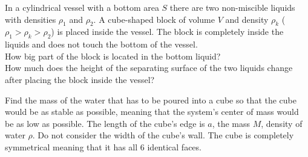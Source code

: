 \documentclass[11pt]{article}
\begin{document}

\probeng
In a cylindrical vessel with a bottom area $S$ there are two non-miscible liquids with densities $\rho_1$ and $\rho_2$. A cube-shaped block of volume $V$ and density $\rho_k$ ($\rho_1>\rho_k>\rho_2$) is placed inside the vessel. The block is completely inside the liquids and does not touch the bottom of the vessel.\\
\osa How big part of the block is located in the bottom liquid?\\
\osa How much does the height of the separating surface of the two liquids change after placing the block inside the vessel?
\probend
\bigskip


\probeng
Find the mass of the water that has to be poured into a cube so that the cube would be as stable as possible, meaning that the system’s center of mass would be as low as possible. The length of the cube’s edge is $a$, the mass $M$, density of water $\rho$. Do not consider the width of the cube’s wall. The cube is completely symmetrical meaning that it has all 6 identical faces.
\probend
\bigskip

\end{document}
